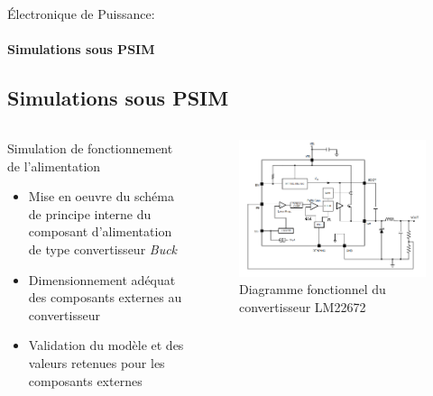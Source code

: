 \documentclass{beamer}
\begin{document}
	\begin{frame}{Électronique de Puissance:}
		\framesubtitle{ Simulations sous PSIM}
		\subsection[Simulations]{Simulations sous PSIM}
		\begin{columns}[T]
	  		\begin{column}{0.5\textwidth}
				Simulation de fonctionnement de l'alimentation
				\begin{itemize}
					\item Mise en oeuvre du schéma de principe interne du composant d'alimentation de type convertisseur \textit{Buck}
					\item Dimensionnement adéquat des composants externes au convertisseur
					\item Validation du modèle et des valeurs retenues pour les composants externes
				\end{itemize}
	  		\end{column}
	  		\begin{column}{0.5\textwidth}
	  			\begin{figure}
	  				\begin{center}
	  					\includegraphics[height=0.5\textheight]{../Illus/func_bloc_lm22672.png}
	  				\end{center}
	    			\caption{Diagramme fonctionnel du convertisseur LM22672}
	    		\end{figure}
	  		\end{column}
		\end{columns}
	\end{frame}
	
\end{document}
